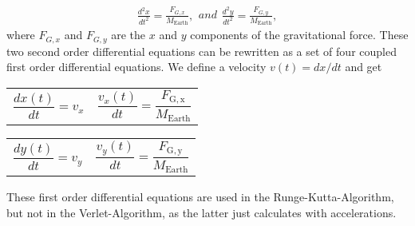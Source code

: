 \documentclass[a4paper]{article}
\begin{document}
\begin{subequations}
\begin{align}
\frac{d^2x}{dt^2}=\frac{F_{G,x}}{M_{\mathrm{Earth}}},
\end{align}
and 
\begin{align}
\frac{d^2y}{dt^2}=\frac{F_{G,y}}{M_{\mathrm{Earth}}},
\end{align}
\end{subequations}
 where $F_{G,x}$ and $F_{G,y}$ are the $x$ and $y$ components of the gravitational force.
\newline
These two second order differential equations can be rewritten as a set of four coupled first order differential equations. We define a velocity $v(t) = dx/dt$ and get 







\noindent\begin{tabularx}{\textwidth}{@{}XX@{}}
  \begin{equation}
  \frac{dx(t)}{dt} = v_x 
  \end{equation} &
  \begin{equation}
  \frac{v_x(t)}{dt} = \frac{F_{\mathrm{G,x}}}{M_\mathrm{Earth}}
  \end{equation}
\end{tabularx}

\noindent\begin{tabularx}{\textwidth}{@{}XX@{}}
  \begin{equation}
  \frac{dy(t)}{dt} = v_y
  \end{equation} &
  \begin{equation}
  \frac{v_y(t)}{dt} = \frac{F_{\mathrm{G,y}}}{M_\mathrm{Earth}}
  \end{equation}
\end{tabularx}

These first order differential equations are used in the Runge-Kutta-Algorithm, but not in the Verlet-Algorithm, as the latter just calculates with accelerations. 
\end{document}
